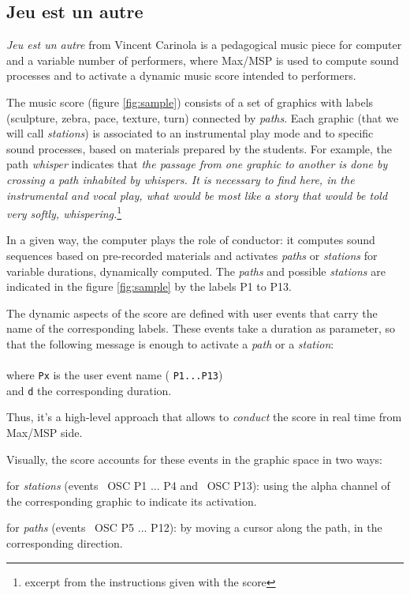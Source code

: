 \documentclass{article}
\newcommand{\OSC}[1]	{{\fontsize{8.5pt}{8pt} \selectfont\texttt{#1}}}
\newcommand{\tab}{\hspace*{4mm}}
\let\olditemize\itemize
\let\oldenditemize\enditemize
\renewenvironment{itemize} 	{\olditemize \renewcommand{\labelitemi}{$\bullet$} \setlength{\itemsep}{0mm}}{\oldenditemize}
\begin{document}
\subsection{Jeu est un autre}

\emph{Jeu est un autre} from Vincent Carinola is a pedagogical music piece for computer and a variable number of performers, where Max/MSP is used to compute sound processes and to activate a dynamic music score intended to performers. 

The music score (figure \ref{fig:sample}) consists of a set of graphics with labels (sculpture, zebra, pace, texture, turn) connected by \emph{paths}. Each graphic (that we will call \emph{stations}) is associated to an instrumental play mode and to specific sound processes, based on materials prepared by the students. For example, the path \emph{whisper} indicates that \emph{the passage from one graphic to another is done by crossing a path inhabited by whispers. It is necessary to find here, in the instrumental and vocal play, what would be most like a story that would be told very softly, whispering.}\footnote{excerpt from the instructions given with the score}

In a given way, the computer plays the role of conductor: it computes sound sequences based on pre-recorded materials and activates \emph{paths} or \emph{stations} for variable durations, dynamically computed. The \emph{paths} and possible \emph{stations} are indicated in the figure \ref{fig:sample} by the labels P1 to P13.

The dynamic aspects of the score are defined with user events that carry the name of the corresponding labels. These events take a duration as parameter, so that the following message is enough to activate a \emph{path} or a \emph{station}:\\
\tab \tab \OSC{/ITL/scene Px d} \\
where \OSC{Px} is the user event name (\OSC{P1...P13})\\
 and \OSC{d} the corresponding duration. 
 
Thus, it's a high-level approach that allows to \emph{conduct} the score in real time from Max/MSP side.

Visually, the score accounts for these events in the graphic space in two ways:
\begin{itemize}
\item for \emph{stations} (events \ OSC {P1 ... P4} and \ OSC {P13}): using the alpha channel of the corresponding graphic to indicate its activation.
\item for \emph{paths} (events \ OSC {P5 ... P12}): by moving a cursor along the path, in the corresponding direction.
\end{itemize}
\end{document}
